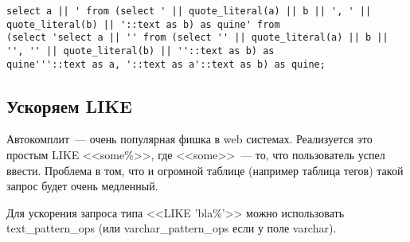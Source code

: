 \begin{lstlisting}[label=lst:snippets13,title=snippets/quine.sql]
select a || ' from (select ' || quote_literal(a) || b || ', ' || quote_literal(b) || '::text as b) as quine' from 
(select 'select a || '' from (select '' || quote_literal(a) || b || '', '' || quote_literal(b) || ''::text as b) as 
quine'''::text as a, '::text as a'::text as b) as quine;
\end{lstlisting}

\subsection{Ускоряем LIKE}
Автокомплит~--- очень популярная фишка в web системах. Реализуется это простым LIKE <<some\%>>, 
где <<some>>~--- то, что пользователь успел ввести. Проблема в том, что и огромной таблице 
(например таблица тегов) такой запрос будет очень медленный.

Для ускорения запроса типа <<LIKE 'bla\%'>> можно использовать text\_pattern\_ops 
(или varchar\_pattern\_ops если у поле varchar).

